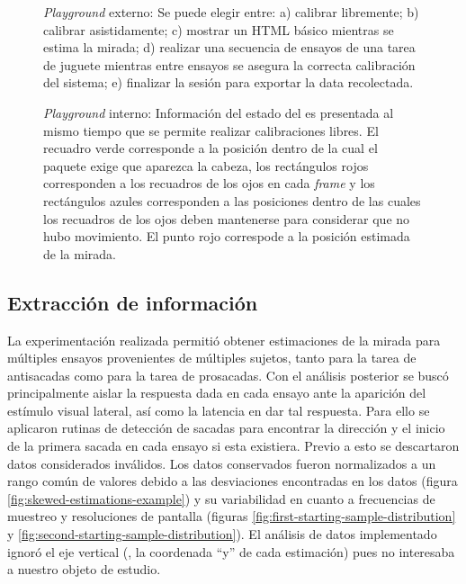   \begin{figure}[hb]
    \centering

    \caption{\textit{Playground} externo: Se puede elegir entre:
    a) calibrar libremente;
    b) calibrar asistidamente;
    c) mostrar un HTML básico mientras se estima la mirada;
    d) realizar una secuencia de ensayos de una tarea de juguete mientras
    entre ensayos se asegura la correcta calibración del sistema;
    e) finalizar la sesión para exportar la data recolectada.
}
    \label{fig:external-playground}
  \end{figure}

  \begin{figure}
    \centering

    
    \caption{\textit{Playground} interno: Información del estado del \eyetracker es presentada al mismo tiempo que se
    permite realizar calibraciones libres.
    El recuadro verde corresponde a la posición dentro de la cual el paquete
    \webgazer exige que aparezca la cabeza, los rectángulos rojos corresponden
    a los recuadros de los ojos en cada \textit{frame} y los rectángulos azules
    corresponden a las posiciones dentro de las cuales los recuadros de los
    ojos deben mantenerse para considerar que no hubo movimiento.
    El punto rojo correspode a la posición estimada de la mirada.
}
    \label{fig:internal-playground}
  \end{figure}

\subsection{Extracción de información}

  La experimentación realizada permitió obtener estimaciones de la mirada para
  múltiples ensayos provenientes de múltiples sujetos, tanto para la tarea de
  antisacadas como para la tarea de prosacadas.
  Con el análisis posterior se buscó principalmente aislar la respuesta dada en
  cada ensayo ante la aparición del estímulo visual lateral, así como la
  latencia en dar tal respuesta.
  Para ello se aplicaron rutinas \adhoc de detección de sacadas para encontrar
  la dirección y el inicio de la primera sacada en cada ensayo si esta
  existiera.
  Previo a esto se descartaron datos considerados inválidos.
  Los datos conservados fueron normalizados a un rango común de valores debido
  a las desviaciones encontradas en los datos (figura
  \ref{fig:skewed-estimations-example}) y su variabilidad en cuanto a
  frecuencias de muestreo y resoluciones de pantalla (figuras
  \ref{fig:first-starting-sample-distribution} y
  \ref{fig:second-starting-sample-distribution}).
  El análisis de datos implementado ignoró el eje vertical (\ie, la coordenada
  ``y'' de cada estimación) pues no interesaba a nuestro objeto de estudio.

